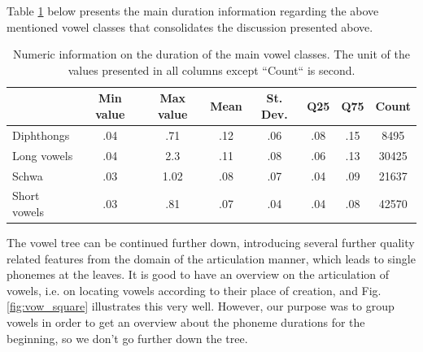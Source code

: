 \documentclass[11pt,a4paper]{scrbook}
\begin{document}
Table \ref{tab:vowel_stats} below presents the main duration information regarding the above mentioned vowel classes that consolidates the discussion presented above.
\begin{table}[htbp]
\centering
\begin{tabular}{|l|c|c|c|c|c|c|c|}

\hline
	 & Min value & Max value & Mean & St. Dev. & Q25 & Q75 & Count\\
\hline
\hline
Diphthongs  	& .04  & .71 & .12 & .06 & .08 & .15 & 8495\\
	\hline
Long vowels   & .04 & 2.3 &  .11 & .08 & .06 & .13 & 30425\\
	\hline
Schwa  &  .03 & 1.02 & .08 & .07 & .04 & .09 & 21637 \\
	\hline
Short vowels & .03 & .81 & .07 & .04 & .04 & .08 & 42570 \\
	\hline
\end{tabular}
\vspace{5mm}
\caption{Numeric information on the duration of the main vowel classes. The unit of the values presented in all columns except ``Count`` is second.} 
\label{tab:vowel_stats}
\end{table}

The vowel tree can be continued further down, introducing several further quality related features from the domain of the articulation manner, which leads to single phonemes at the leaves. It is good to have an overview on the articulation of vowels, i.e. on locating vowels according to their place of creation, and Fig. \ref{fig:vow_square} illustrates this very well. However, our purpose was to group vowels in order to get an overview about the phoneme durations for the beginning, so we don't go further down the tree. 
\end{document}
